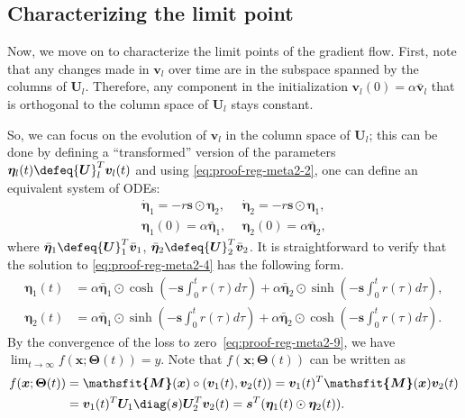 \documentclass{article} %
\def\vs{{\bm{s}}}
\def\vv{{\bm{v}}}
\def\vx{{\bm{x}}}
\def\mU{{\bm{U}}}
\newcommand{\tens}[1]{\bm{\mathsfit{#1}}}
\def\tM{{\tens{M}}}
\newcommand{\bTheta}{\bm{\Theta}}
\newcommand{\veta}{{\bm{\eta}}}
\begin{document}
\subsection{Characterizing the limit point}
Now, we move on to characterize the limit points of the gradient flow. First, note that any changes made in $\vv_l$ over time are in the subspace spanned by the columns of $\mU_l$. Therefore, any component in the initialization $\vv_l(0) = \alpha \bar \vv_l$ that is orthogonal to the column space of $\mU_l$ stays constant.

So, we can focus on the evolution of $\vv_l$ in the column space of $\mU_l$; this can be done by defining a ``transformed'' version of the parameters $\veta_l(t) \defeq \mU_l^T \vv_l(t)$ and using \eqref{eq:proof-reg-meta2-2}, one can define an equivalent system of ODEs:
\begin{equation}
\label{eq:proof-reg-meta2-4}
\begin{aligned}
    \dot \veta_1 = -r \vs \odot \veta_2,~&~
    \dot \veta_2 = -r \vs \odot \veta_1,\\
    \veta_1(0) = \alpha \bar \veta_1,~&~
    \veta_2(0) = \alpha \bar \veta_2,
\end{aligned}
\end{equation}
where $\bar \veta_1 \defeq \mU_1^T \bar \vv_1$, $\bar \veta_2 \defeq \mU_2^T \bar \vv_2$.
It is straightforward to verify that the solution to \eqref{eq:proof-reg-meta2-4} has the following form.
\begin{equation}
\label{eq:proof-reg-meta2-7}
\begin{aligned}
    \veta_1(t) &= 
    \alpha \bar \veta_1 \odot \cosh \left (-\vs \int_0^t r(\tau)d\tau \right) 
    + \alpha \bar \veta_2 \odot \sinh \left (-\vs \int_0^t r(\tau)d\tau \right)
    ,\\
    \veta_2(t) &= 
    \alpha \bar \veta_1 \odot \sinh \left (-\vs \int_0^t r(\tau)d\tau \right) 
    + \alpha \bar \veta_2 \odot \cosh \left (-\vs \int_0^t r(\tau)d\tau \right).
\end{aligned}
\end{equation}
By the convergence of the loss to zero~\eqref{eq:proof-reg-meta2-9}, we have $\lim_{t \to \infty} f(\vx; \bTheta(t)) = y$. Note that $f(\vx; \bTheta(t))$ can be written as
\begin{align*}
    f(\vx; \bTheta(t))
    &= \tM(\vx) \circ (\vv_1(t), \vv_2(t))
    = \vv_1(t)^T \tM(\vx) \vv_2(t)\\
    &= \vv_1(t)^T \mU_1 \diag(\vs) \mU_2^T \vv_2(t)
    = \vs^T (\veta_1(t) \odot \veta_2(t)).
\end{align*}
\end{document}
